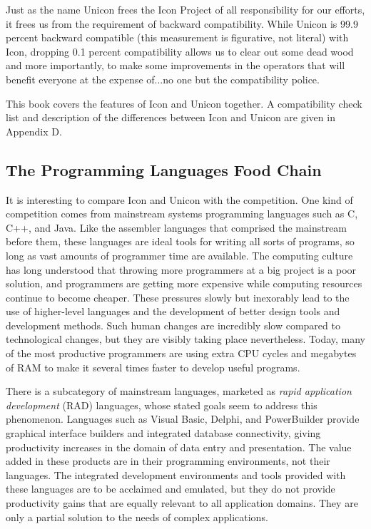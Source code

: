 Just as the name Unicon frees the Icon Project of all responsibility for
our efforts, it frees us from the requirement of backward
compatibility. While Unicon is 99.9 percent backward compatible (this
measurement is figurative, not literal) with Icon, dropping 0.1 percent
compatibility allows us to clear out some dead wood and more
importantly, to make some improvements in the operators that will
benefit everyone at the expense of...no one but the compatibility
police.

This book covers the features of Icon and Unicon together. A
compatibility check list and description of the differences between
Icon and Unicon are given in Appendix D.

\subsection{The Programming Languages Food Chain}
It is interesting to compare Icon and Unicon with the competition. One
kind of competition comes from mainstream systems programming languages
such as C, C++, and Java. Like the assembler languages that
comprised the mainstream before them, these languages are ideal tools
for writing all sorts of programs, so long as vast amounts of
programmer time are available. The computing culture has long
understood that throwing more programmers at a big project is a poor
solution, and programmers are getting more expensive while computing
resources continue to become cheaper. These pressures slowly but
inexorably lead to the use of higher-level languages and the
development of better design tools and development methods. Such human
changes are incredibly slow compared to technological changes, but they
are visibly taking place nevertheless. Today, many of the most
productive programmers are using extra CPU cycles and megabytes of RAM
to make it several times faster to develop useful programs.

There is a subcategory of mainstream languages, marketed as \textit{rapid application development} (RAD)
languages, whose stated goals seem to address this phenomenon.
Languages such as Visual Basic,
Delphi, and PowerBuilder provide
graphical interface builders and integrated database connectivity,
giving productivity increases in the domain of data entry and
presentation. The value added in these products are in their
programming environments, not their languages. The integrated development environments and tools
provided with these languages are to be acclaimed and emulated, but
they do not provide productivity gains that are equally relevant to all
application domains. They are only a partial solution to the needs of
complex applications.

